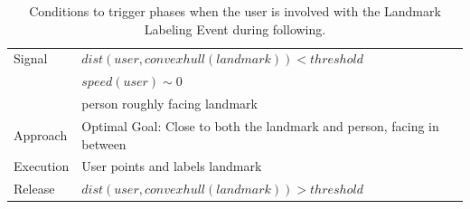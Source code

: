 \begin{table}[ht!]

	\caption{Conditions to trigger phases when the user is involved with the Landmark Labeling Event during following.}
	
		\centering
		
  \begin{tabular}{l |  m{10cm}}
    \toprule    
    Signal & {$dist(user, convex hull(landmark))<threshold$}\\       
	                           & {$speed(user)\sim 0$} \\
	                           & {person roughly facing landmark}\\ \midrule		                           		                                
    Approach & {Optimal Goal: Close to both the landmark and person, facing in between}\\       \midrule
    Execution & {User points and labels landmark}\\  \midrule
    Release & {$dist(user, convex hull(landmark))>threshold$}\\ 
    \bottomrule
  \end{tabular}
    \label{table:situation_aware_list_landmark}
\end{table}


